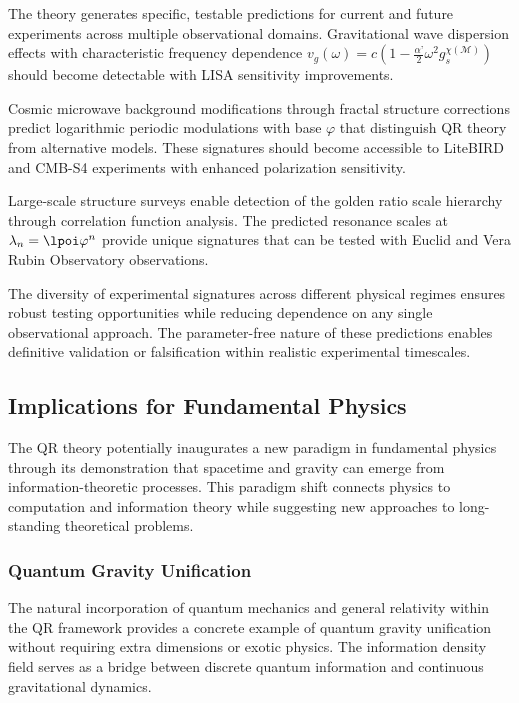 The theory generates specific, testable predictions for current and future experiments across multiple observational domains. Gravitational wave dispersion effects with characteristic frequency dependence $v_g(\omega) = c(1 - \frac{\alpha’}{2}\omega^2 g_s^{\chi(\mathcal{M})})$ should become detectable with LISA sensitivity improvements.

Cosmic microwave background modifications through fractal structure corrections predict logarithmic periodic modulations with base $\varphi$ that distinguish QR theory from alternative models. These signatures should become accessible to LiteBIRD and CMB-S4 experiments with enhanced polarization sensitivity.

Large-scale structure surveys enable detection of the golden ratio scale hierarchy through correlation function analysis. The predicted resonance scales at $\lambda_n = \lpoi \varphi^n$ provide unique signatures that can be tested with Euclid and Vera Rubin Observatory observations.

The diversity of experimental signatures across different physical regimes ensures robust testing opportunities while reducing dependence on any single observational approach. The parameter-free nature of these predictions enables definitive validation or falsification within realistic experimental timescales.

\subsection{Implications for Fundamental Physics}
\label{subsec:fundamental-implications}

The QR theory potentially inaugurates a new paradigm in fundamental physics through its demonstration that spacetime and gravity can emerge from information-theoretic processes. This paradigm shift connects physics to computation and information theory while suggesting new approaches to long-standing theoretical problems.

\subsubsection{Quantum Gravity Unification}
\label{subsubsec:quantum-gravity-unification}

The natural incorporation of quantum mechanics and general relativity within the QR framework provides a concrete example of quantum gravity unification without requiring extra dimensions or exotic physics. The information density field serves as a bridge between discrete quantum information and continuous gravitational dynamics.

